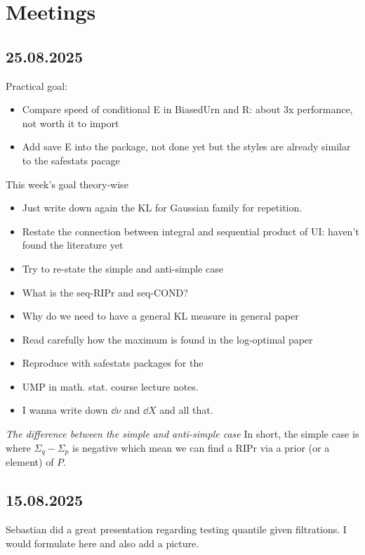 \newpage

\section{Meetings}

\subsection*{25.08.2025}
Practical goal:
\begin{itemize}
	\item Compare speed of conditional E in BiasedUrn and R: about 3x performance, not worth it to import
	\item Add save E into the package, not done yet but the styles are already similar to the safestats
	      pacage
\end{itemize}

This week's goal theory-wise
\begin{itemize}
	\item Just write down again the KL for Gaussian family for repetition.
	\item Restate the connection between integral and sequential product of UI:
	      haven't found the literature yet
	\item Try to re-state the simple and anti-simple case
	\item What is the seq-RIPr and seq-COND?
	\item Why do we need to have a general KL measure in general paper
	\item Read carefully how the maximum is found in the log-optimal paper
	\item Reproduce with safestats packages for the
	\item UMP in math. stat. course lecture notes.
	\item I wanna write down $\dd{\nu}$ and $\dd{X}$ and all that.
\end{itemize}

\emph{The difference between the simple and anti-simple case} In short, the simple case
is where $\Sigma_q-\Sigma_p$ is negative which mean we can find a RIPr via a prior (or a element)
of $P$.

\subsection*{15.08.2025} Sebastian did a great presentation regarding testing
quantile given filtrations. I would formulate here and also add a picture.

